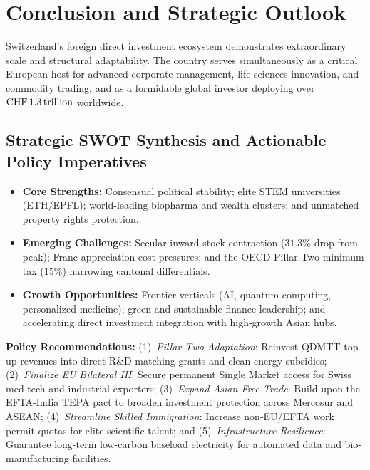 
\section{Conclusion and Strategic Outlook}

Switzerland's foreign direct investment ecosystem demonstrates extraordinary scale and structural adaptability. The country serves simultaneously as a critical European host for advanced corporate management, life-sciences innovation, and commodity trading, and as a formidable global investor deploying over $\text{CHF}\,1.3\,\text{trillion}$ worldwide.

\subsection{Strategic SWOT Synthesis and Actionable Policy Imperatives}

\begin{itemize}[leftmargin=1.5em, itemsep=2pt]
    \item \textbf{Core Strengths:} Consensual political stability; elite STEM universities (ETH/EPFL); world-leading biopharma and wealth clusters; and unmatched property rights protection.
    \item \textbf{Emerging Challenges:} Secular inward stock contraction ($31.3\%$ drop from peak); Franc appreciation cost pressures; and the OECD Pillar Two minimum tax ($15\%$) narrowing cantonal differentials.
    \item \textbf{Growth Opportunities:} Frontier verticals (AI, quantum computing, personalized medicine); green and sustainable finance leadership; and accelerating direct investment integration with high-growth Asian hubs.
\end{itemize}

\noindent\textbf{Policy Recommendations:} (1)~\textit{Pillar Two Adaptation}: Reinvest QDMTT top-up revenues into direct R\&D matching grants and clean energy subsidies; (2)~\textit{Finalize EU Bilateral III}: Secure permanent Single Market access for Swiss med-tech and industrial exporters; (3)~\textit{Expand Asian Free Trade}: Build upon the EFTA-India TEPA pact to broaden investment protection across Mercosur and ASEAN; (4)~\textit{Streamline Skilled Immigration}: Increase non-EU/EFTA work permit quotas for elite scientific talent; and (5)~\textit{Infrastructure Resilience}: Guarantee long-term low-carbon baseload electricity for automated data and bio-manufacturing facilities.

